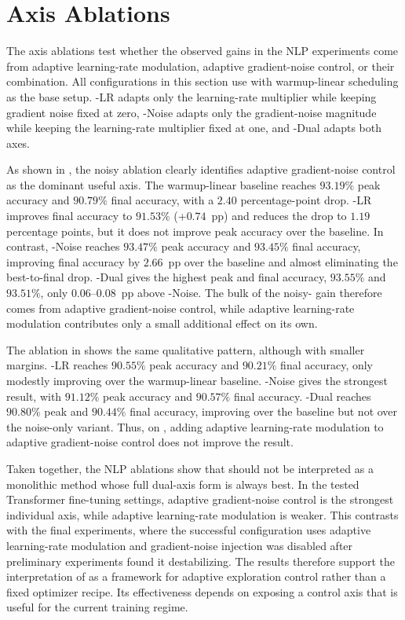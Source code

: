 \section{Axis Ablations}
\label{sec:axis-ablations}

The axis ablations test whether the observed \method{} gains in the NLP experiments come from adaptive learning-rate modulation, adaptive gradient-noise control, or their combination. All configurations in this section use \adamw{} with warmup-linear scheduling as the base setup. \method{}-LR adapts only the learning-rate multiplier while keeping gradient noise fixed at zero, \method{}-Noise adapts only the gradient-noise magnitude while keeping the learning-rate multiplier fixed at one, and \method{}-Dual adapts both axes.




As shown in , the noisy \agnews{} ablation clearly identifies adaptive gradient-noise control as the dominant useful axis. The warmup-linear baseline reaches $93.19\%$ peak accuracy and $90.79\%$ final accuracy, with a $2.40$ percentage-point drop. \method{}-LR improves final accuracy to $91.53\%$ (+$0.74$~pp) and reduces the drop to $1.19$ percentage points, but it does not improve peak accuracy over the baseline. In contrast, \method{}-Noise reaches $93.47\%$ peak accuracy and $93.45\%$ final accuracy, improving final accuracy by $2.66$~pp over the baseline and almost eliminating the best-to-final drop. \method{}-Dual gives the highest peak and final accuracy, $93.55\%$ and $93.51\%$, only $0.06$--$0.08$~pp above \method{}-Noise. The bulk of the noisy-\agnews{} gain therefore comes from adaptive gradient-noise control, while adaptive learning-rate modulation contributes only a small additional effect on its own.

The \sst{} ablation in  shows the same qualitative pattern, although with smaller margins. \method{}-LR reaches $90.55\%$ peak accuracy and $90.21\%$ final accuracy, only modestly improving over the warmup-linear baseline. \method{}-Noise gives the strongest result, with $91.12\%$ peak accuracy and $90.57\%$ final accuracy. \method{}-Dual reaches $90.80\%$ peak and $90.44\%$ final accuracy, improving over the baseline but not over the noise-only variant. Thus, on \sst{}, adding adaptive learning-rate modulation to adaptive gradient-noise control does not improve the result.

Taken together, the NLP ablations show that \method{} should not be interpreted as a monolithic method whose full dual-axis form is always best. In the tested Transformer fine-tuning settings, adaptive gradient-noise control is the strongest individual axis, while adaptive learning-rate modulation is weaker. This contrasts with the final \cifar{} experiments, where the successful configuration uses adaptive learning-rate modulation and gradient-noise injection was disabled after preliminary experiments found it destabilizing. The results therefore support the interpretation of \method{} as a framework for adaptive exploration control rather than a fixed optimizer recipe. Its effectiveness depends on exposing a control axis that is useful for the current training regime.